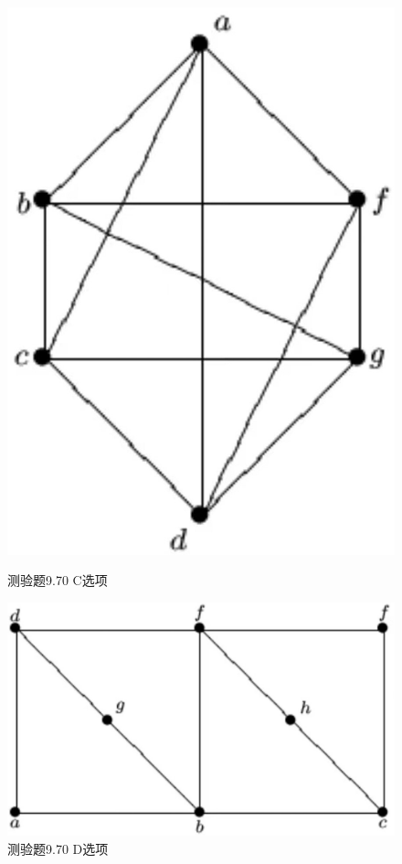 \documentclass[UTF8, heading=true]{ctexart}
\begin{document}
\begin{figure}[H]
  \centering
  \begin{minipage}[t]{0.2\textwidth}
      \centering
      \includegraphics[width=1\textwidth]{9.67_3.jpg} %
      \vspace{-0.3cm}
      \caption{测验题9.70 C选项}
  \end{minipage}
  \hspace{0.22\textwidth} %
  \begin{minipage}[t]{0.35\textwidth}
      \centering
      \includegraphics[width=1\textwidth]{9.67_4.jpg} %
      \vspace{-0.3cm}
      \caption{测验题9.70 D选项}
\end{minipage}
\end{figure}
\end{document}
